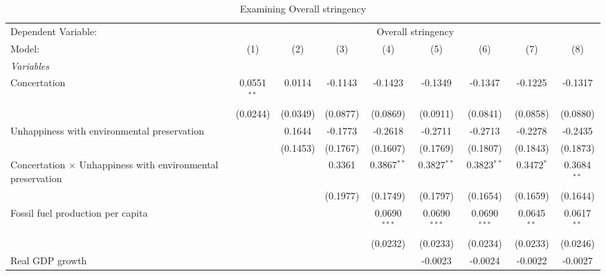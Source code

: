
\begin{table}[htbp]
   \caption{Examining Overall stringency}
   \centering
   \begin{tabular}{lcccccccc}
      \tabularnewline \midrule \midrule
      Dependent Variable: & \multicolumn{8}{c}{Overall stringency}\\
      Model:                                                             & (1)           & (2)      & (3)      & (4)            & (5)            & (6)                    & (7)           & (8)\\  
      \midrule
      \emph{Variables}\\
      Concertation                                                       & 0.0551$^{**}$ & 0.0114   & -0.1143  & -0.1423        & -0.1349        & -0.1347                & -0.1225       & -0.1317\\   
                                                                         & (0.0244)      & (0.0349) & (0.0877) & (0.0869)       & (0.0911)       & (0.0841)               & (0.0858)      & (0.0880)\\   
      Unhappiness with environmental preservation                        &               & 0.1644   & -0.1773  & -0.2618        & -0.2711        & -0.2713                & -0.2278       & -0.2435\\   
                                                                         &               & (0.1453) & (0.1767) & (0.1607)       & (0.1769)       & (0.1807)               & (0.1843)      & (0.1873)\\   
      Concertation $\times$ Unhappiness with environmental preservation  &               &          & 0.3361   & 0.3867$^{**}$  & 0.3827$^{**}$  & 0.3823$^{**}$          & 0.3472$^{*}$  & 0.3684$^{**}$\\   
                                                                         &               &          & (0.1977) & (0.1749)       & (0.1797)       & (0.1654)               & (0.1659)      & (0.1644)\\   
      Fossil fuel production per capita                                  &               &          &          & 0.0690$^{***}$ & 0.0690$^{***}$ & 0.0690$^{***}$         & 0.0645$^{**}$ & 0.0617$^{**}$\\   
                                                                         &               &          &          & (0.0232)       & (0.0233)       & (0.0234)               & (0.0233)      & (0.0246)\\   
      Real GDP growth                                                    &               &          &          &                & -0.0023        & -0.0024                & -0.0022       & -0.0027\\   

\end{tabular}
\end{table}
